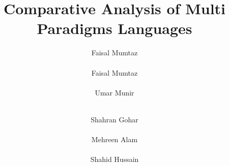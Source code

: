 \documentclass{sig-alternate}
\begin{document}
%

\title{Comparative Analysis of Multi Paradigms Languages}

%
%
%
%
%

%
\author{
%
%
\alignauthor
Faisal Mumtaz\\
       \\
\alignauthor
Faisal Mumtaz\\
\\
\alignauthor Umar Munir\\
\\
\and  %
\alignauthor Shahran Gohar \\
\\
\alignauthor Mehreen Alam\\
\\
\alignauthor Shahid Hussain\\
\\
}
\end{document}
